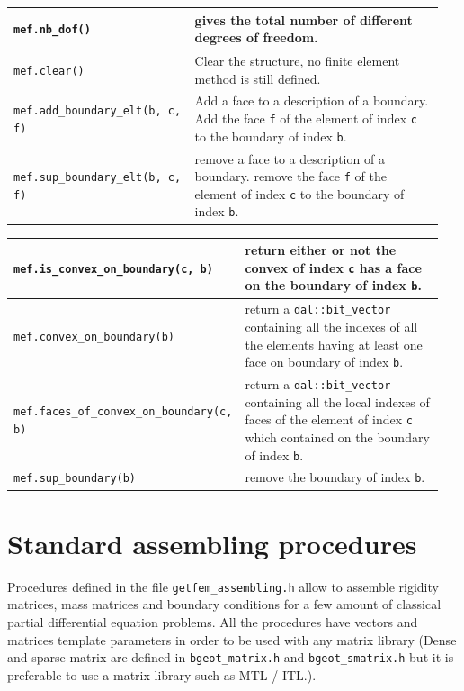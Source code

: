 \documentclass[11pt,a4paper]{article}
\begin{document}
\begin{center}
\begin{tabular}{|m{0.4\linewidth}|m{0.55\linewidth}|}
  {\tt mef.nb\_dof()} & gives the total number of different degrees of freedom.  \\ \hline

  {\tt mef.clear()} & Clear the structure, no finite element method is still defined.  \\ \hline

  {\tt mef.add\_boundary\_elt(b, c, f)} & Add a face to a description of a boundary. Add the face {\tt f} of the element of index {\tt c} to the boundary of index {\tt b}.  \\ \hline
  
  {\tt mef.sup\_boundary\_elt(b, c, f)} & remove a face to a description of a boundary. remove the face {\tt f} of the element of index {\tt c} to the boundary of index {\tt b}.  \\ \hline
\end{tabular} \end{center}

\begin{center} \begin{tabular}{|m{0.4\linewidth}|m{0.55\linewidth}|} \hline
  
  {\tt mef.is\_convex\_on\_boundary(c, b)} & return either or not the convex of index {\tt c}  has a face on the boundary of index {\tt b}.  \\ \hline
  
  {\tt mef.convex\_on\_boundary(b)} & return a {\tt dal::bit\_vector} containing all the indexes of all the elements having at least one face on boundary of index {\tt b}.  \\ \hline

  {\tt mef.faces\_of\_convex\_on\_boundary(c, b) } & return a {\tt dal::bit\_vector} containing all the local indexes of faces of the element of index {\tt c} which contained on the boundary of index {\tt b}.  \\ \hline

  {\tt mef.sup\_boundary(b) } & remove the boundary of index {\tt b}.  \\ \hline

\end{tabular} \end{center}


\section{Standard assembling procedures}

Procedures defined in the file {\tt getfem\_assembling.h} allow to assemble rigidity matrices, mass matrices and boundary conditions for a few amount of classical partial differential equation problems. All the procedures have vectors and matrices template parameters in order to be used with any matrix library (Dense and sparse matrix are defined in {\tt bgeot\_matrix.h} and {\tt bgeot\_smatrix.h} but it is preferable to use a matrix library such as MTL / ITL.).
\end{document}
